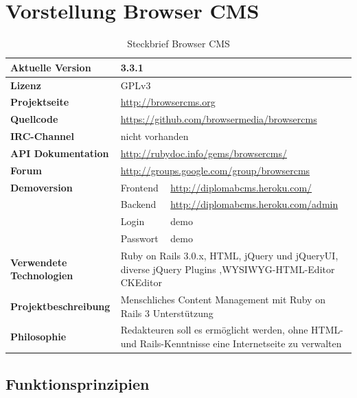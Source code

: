 \newpage
\section{Vorstellung Browser CMS}
\begin{table}
\caption{Steckbrief Browser CMS}
\begin{tabular}[!ht]{|l|l|l|}
\hline
\textbf{Aktuelle Version} & \multicolumn{2}{p{10cm}|}{3.3.1} \\
\hline
\textbf{Lizenz} & \multicolumn{2}{p{10cm}|}{GPLv3} \\
\hline
\textbf{Projektseite} & \multicolumn{2}{p{10cm}|}{\href{http://browsercms.org}{http://browsercms.org}} \\
\hline
\textbf{Quellcode} & \multicolumn{2}{p{10cm}|}{\href{https://github.com/browsermedia/browsercms
}{https://github.com/browsermedia/browsercms}} \\
\hline
\textbf{IRC-Channel} & \multicolumn{2}{p{10cm}|}{nicht vorhanden} \\
\hline
\textbf{API Dokumentation} & \multicolumn{2}{p{10cm}|}{\href{http://rubydoc.info/gems/browsercms/
}{http://rubydoc.info/gems/browsercms/}} \\
\hline
\textbf{Forum} & \multicolumn{2}{p{10cm}|}{\href{http://groups.google.com/group/browsercms}{http://groups.google.com/group/browsercms}} \\
\hline
\textbf{Demoversion} & Frontend & \href{http://diplomabcms.heroku.com/}{http://diplomabcms.heroku.com/} \\
\cline{2-3}
& Backend & \href{http://diplomabcms.heroku.com/cms}{http://diplomabcms.heroku.com/admin} \\
\cline{2-3}
& Login & demo \\
\cline{2-3}
& Passwort & demo \\
\hline
\textbf{Verwendete Technologien} & \multicolumn{2}{p{10cm}|}{Ruby on Rails 3.0.x, HTML, jQuery und jQueryUI, diverse jQuery Plugins ,WYSIWYG-HTML-Editor CKEditor} \\
\hline
\textbf{Projektbeschreibung} & \multicolumn{2}{p{10cm}|}{Menschliches Content Management mit Ruby on Rails 3 Unterstützung} \\
\hline
\textbf{Philosophie} & \multicolumn{2}{p{10cm}|}{Redakteuren soll es ermöglicht werden, ohne HTML- und Rails-Kenntnisse eine Internetseite zu verwalten} \\
\hline
\end{tabular}
\end{table}
\subsection{Funktionsprinzipien}

